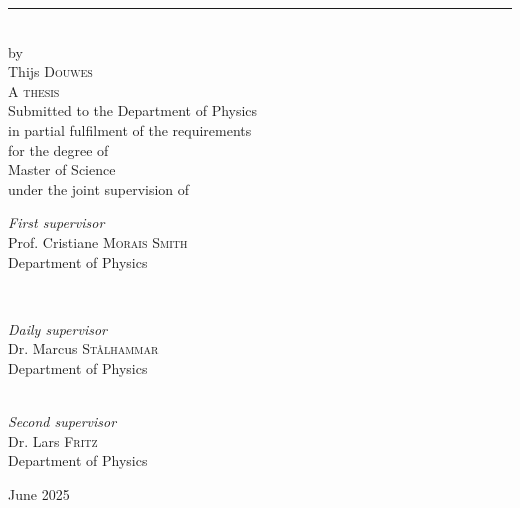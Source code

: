 \documentclass[12pt,a4paper]{report}
\theoremstyle{definition}
\theoremstyle{remark}
\newcommand{\?}{\stackrel{?}{=}}
\begin{document}
\begin{titlepage}
	\rule{\linewidth}{0.5mm}\\[.8cm]
	
	
	{\large by}\\[.8cm]
	
	
	{\LARGE Thijs \textsc{Douwes}}\\[1.1cm]
	
	
	
	{\Large \textsc{A thesis}}\\[.8cm]
	
	
	{\large Submitted to the Department of Physics}\\[.1cm] 
	{\large in partial fulfilment of the requirements}\\[.1cm]
	{\large for the degree of}\\[.5cm]
	
	{\Large Master of Science}\\[.9cm]
	
	
	{\large under the joint supervision of}\\[1.3cm]
	
	
	\begin{minipage}{0.51\textwidth}
		\begin{flushleft}
			\large
			\textit{First supervisor}\\
			Prof. Cristiane \textsc{Morais Smith}\\
			\normalsize Department of Physics
		\end{flushleft}
	\end{minipage}
	~
	\begin{minipage}{0.42\textwidth}
		\begin{flushright}
			\large
			\textit{Daily supervisor}\\
			Dr. Marcus \textsc{St{\aa}lhammar}\\
			\normalsize Department of Physics
		\end{flushright}
	\end{minipage} \\[.7cm]
	
	\large
	\textit{Second supervisor}\\
	Dr. Lars \textsc{Fritz}\\
	\normalsize Department of Physics
	
	\vfill\vfill\vfill  %
	
	{\large June 2025} 
	
	\vfill  %
\end{titlepage}
\end{document}
